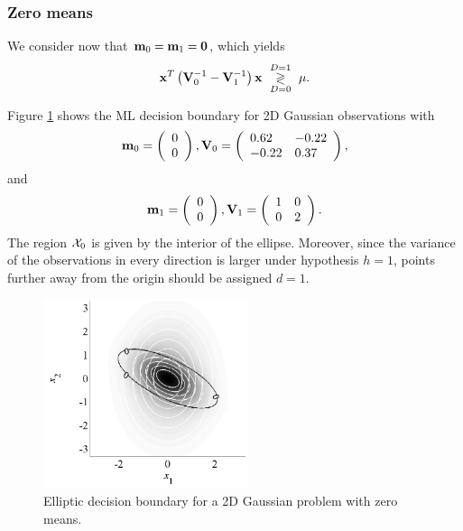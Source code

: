 \subsubsection{Zero means}

We consider now that ${\bf m}_0 = {\bf m}_1 = \mathbf{0}$, which yields
\begin{equation*}
{\bf x}^T \left({\bf V}_0^{-1}-{\bf V}_1^{-1}\right){\bf x} \,\, \underset{D=0}{\overset{D=1}{\gtrless}}\,\, \mu.
\label{eq:logLRTGauss2m0}
\end{equation*}

\begin{example}
	Figure \ref{fig:DecGauss2Deqm} shows the ML decision boundary for 2D Gaussian observations with
		\begin{equation*}
{\bf m}_0 =  \left(\begin{array}{l}  0\\0   \end{array}\right), {\bf V}_0 = 
\left(\begin{array}{ll} 0.62 & -0.22 \\ -0.22 & 0.37 \end{array} \right),
\end{equation*}
and
\begin{equation*}
{\bf m}_1 = \left(\begin{array}{l}  0\\0  \end{array}\right), {\bf V}_1 = 
\left(\begin{array}{ll} 1 & 0 \\ 0 & 2 \end{array} \right).
\end{equation*}
	The region ${\cal X}_0$ is given by the interior of the ellipse. Moreover, since the variance of the observations in every direction is larger under hypothesis $h=1$, points further away from the origin should be assigned $d=1$.
	\begin{figure}[htb]
		\begin{center}
			\includegraphics[width=6cm]{Figures/DecGauss2Deqm.pdf}
			\caption{Elliptic decision boundary for a 2D Gaussian problem with zero means.}
			\label{fig:DecGauss2Deqm}
		\end{center}
	\end{figure}
\end{example}

